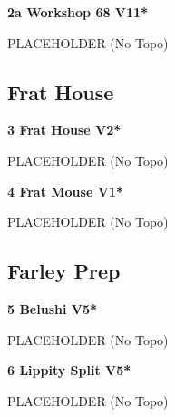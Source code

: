 \begin{multicols}{2}
\begin{adjustwidth}{0.5cm}{}
\needspace{1.5cm}
\label{vr:Workshop 68}
\colorbox{red!20}{
\parbox{0.95\linewidth}{
\textbf{
2a Workshop 68 V11*  
}}}

\begin{adjustwidth}{0.5cm}{}			
PLACEHOLDER (No Topo)
\end{adjustwidth}


\end{adjustwidth}



\needspace{1.5cm}
\subsection*{Frat House}\label{bf:Frat House}
	


\needspace{1.5cm}
\label{rt:Frat House}
\colorbox{green!20}{
\parbox{0.95\linewidth}{
\textbf{
3 Frat House V2*  
}}}

\begin{adjustwidth}{0.5cm}{}			
PLACEHOLDER (No Topo)
\end{adjustwidth}



\needspace{1.5cm}
\label{rt:Frat Mouse}
\colorbox{green!20}{
\parbox{0.95\linewidth}{
\textbf{
4 Frat Mouse V1*  
}}}

\begin{adjustwidth}{0.5cm}{}			
PLACEHOLDER (No Topo)
\end{adjustwidth}




\needspace{1.5cm}
\subsection*{Farley Prep}\label{bf:Farley Prep}
	


\needspace{1.5cm}
\label{rt:Belushi}
\colorbox{RoyalBlue!20}{
\parbox{0.95\linewidth}{
\textbf{
5 Belushi V5*  
}}}

\begin{adjustwidth}{0.5cm}{}			
PLACEHOLDER (No Topo)
\end{adjustwidth}



\needspace{1.5cm}
\label{rt:Lippity Split}
\colorbox{RoyalBlue!20}{
\parbox{0.95\linewidth}{
\textbf{
6 Lippity Split V5*  
}}}

\begin{adjustwidth}{0.5cm}{}			
PLACEHOLDER (No Topo)
\end{adjustwidth}




\end{multicols}
